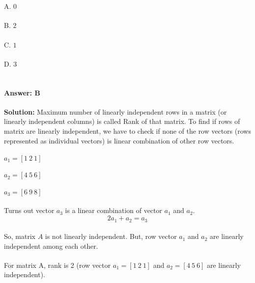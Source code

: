 \documentclass[prl,twocolumn,showpacs,preprintnumbers,superscriptaddress]{revtex4}
\theoremstyle{plain}
\theoremstyle{definition}
\begin{document}
\begin{widetext}
{\[\]
\\
\\
A. $0$\\
\\
B. $2$\\
\\
C. $1$\\
\\
D. $3$
\\
\\
\\
\textbf{Answer: B}
\\
\\
\textbf{Solution:} 
Maximum number of linearly independent rows in a matrix (or linearly independent columns) is called Rank of that matrix.
To find if rows of matrix are linearly independent, we have to check if none of the row vectors (rows represented as individual vectors) is linear combination of other row vectors.
\\
\\
$a_{1} = [1\  2\  1]$ 
\\
\\
$a_{2} = [4\  5\  6]$
\\
\\
$a_{3} = [6\  9\  8]$
\\
\\
Turns out vector $a_{3}$ is a linear combination of vector $a_{1}$ and $a_{2}$.
\begin{equation}
    2a_{1} + a_{2} = a_{3} {}\nonumber
\end{equation}
\\
So, matrix $A$ is not linearly independent. But, row vector $a_{1}$ and $a_{2}$ are linearly independent among each other.
\\
\\
For matrix A, rank is 2 (row vector $a_{1} = [1\  2\  1]$ and $a_{2} = [4\  5\  6]$ are linearly independent).
\\
\\
\\
}
\end{widetext}
\end{document}
